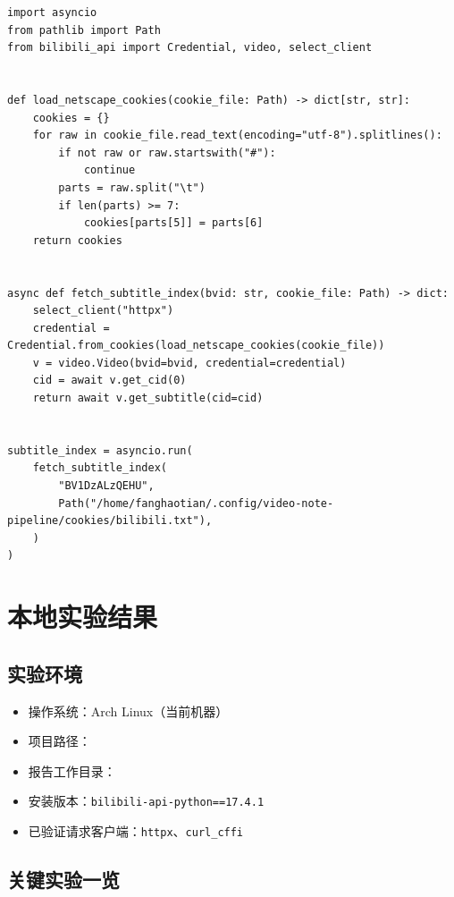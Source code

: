 \documentclass[a4paper]{article}
\begin{document}
\begin{lstlisting}[caption={将现有 cookie file 转为 Credential 并获取字幕元信息的最小原型}]
import asyncio
from pathlib import Path
from bilibili_api import Credential, video, select_client


def load_netscape_cookies(cookie_file: Path) -> dict[str, str]:
    cookies = {}
    for raw in cookie_file.read_text(encoding="utf-8").splitlines():
        if not raw or raw.startswith("#"):
            continue
        parts = raw.split("\t")
        if len(parts) >= 7:
            cookies[parts[5]] = parts[6]
    return cookies


async def fetch_subtitle_index(bvid: str, cookie_file: Path) -> dict:
    select_client("httpx")
    credential = Credential.from_cookies(load_netscape_cookies(cookie_file))
    v = video.Video(bvid=bvid, credential=credential)
    cid = await v.get_cid(0)
    return await v.get_subtitle(cid=cid)


subtitle_index = asyncio.run(
    fetch_subtitle_index(
        "BV1DzALzQEHU",
        Path("/home/fanghaotian/.config/video-note-pipeline/cookies/bilibili.txt"),
    )
)
\end{lstlisting}

\section{本地实验结果}

\subsection{实验环境}

\begin{itemize}
\item 操作系统：Arch Linux（当前机器）
\item 项目路径：
\item 报告工作目录：
\item 安装版本：\texttt{bilibili-api-python==17.4.1}
\item 已验证请求客户端：\texttt{httpx}、\texttt{curl\_cffi}
\end{itemize}

\subsection{关键实验一览}
\end{document}
